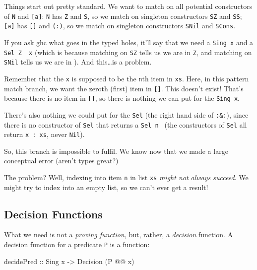 \documentclass[]{article}
\newenvironment{Shaded}{}{}
\newcommand{\DataTypeTok}[1]{\textcolor[rgb]{0.56,0.13,0.00}{#1}}
\newcommand{\NormalTok}[1]{#1}
\newcommand{\OperatorTok}[1]{\textcolor[rgb]{0.40,0.40,0.40}{#1}}
\newcommand{\OtherTok}[1]{\textcolor[rgb]{0.00,0.44,0.13}{#1}}
\begin{document}
Things start out pretty standard. We want to match on all potential constructors
of \texttt{N} and \texttt{{[}a{]}}: \texttt{N} has \texttt{Z} and \texttt{S}, so
we match on singleton constructors \texttt{SZ} and \texttt{SS}; \texttt{{[}a{]}}
has \texttt{{[}{]}} and \texttt{(:)}, so we match on singleton constructors
\texttt{SNil} and \texttt{SCons}.

If you ask ghc what goes in the typed holes, it'll say that we need a
\texttt{Sing\ x} and a
\texttt{Sel\ \textquotesingle{}Z\ \textquotesingle{}{[}{]}\ x} (which is because
matching on \texttt{SZ} tells us we are in \texttt{\textquotesingle{}Z}, and
matching on \texttt{SNil} tells us we are in \texttt{\textquotesingle{}{[}{]}}).
And this\ldots is a problem.

Remember that the \texttt{x} is supposed to be the \texttt{n}th item in
\texttt{xs}. Here, in this pattern match branch, we want the zeroth (first) item
in \texttt{{[}{]}}. This doesn't exist! That's because there is no item in
\texttt{{[}{]}}, so there is nothing we can put for the \texttt{Sing\ x}.

There's also nothing we could put for the \texttt{Sel} (the right hand side of
\texttt{:\&:}), since there is no constructor of \texttt{Sel} that returns a
\texttt{Sel\ n\ \textquotesingle{}{[}{]}} (the constructors of \texttt{Sel} all
return \texttt{x\ \textquotesingle{}:\ xs}, never \texttt{Nil}).

So, this branch is impossible to fulfil. We know now that we made a large
conceptual error (aren't types great?)

The problem? Well, indexing into item \texttt{n} in list \texttt{xs} \emph{might
not always succeed}. We might try to index into an empty list, so we can't ever
get a result!

\subsection{Decision Functions}\label{decision-functions}

What we need is not a \emph{proving function}, but, rather, a \emph{decision}
function. A decision function for a predicate \texttt{P} is a function:

\begin{Shaded}
\begin{Highlighting}[]
\OtherTok{decidePred ::} \DataTypeTok{Sing}\NormalTok{ x}
           \OtherTok{{-}\textgreater{}} \DataTypeTok{Decision}\NormalTok{ (}\DataTypeTok{P} \OperatorTok{@@}\NormalTok{ x)}
\end{Highlighting}
\end{Shaded}
\end{document}
